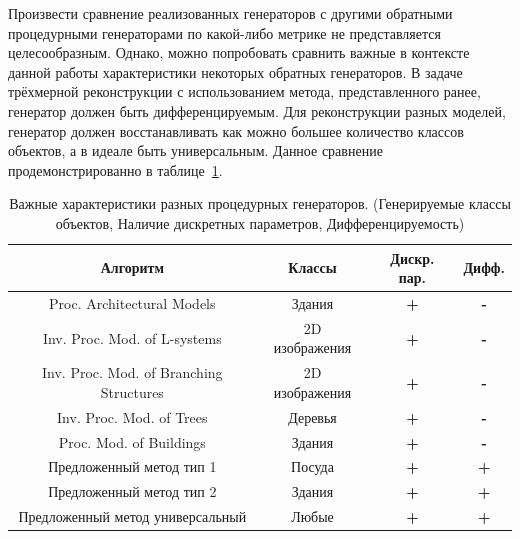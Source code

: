 \documentclass[a4paper,hidelinks,12pt]{article}
\begin{document}
Произвести сравнение реализованных генераторов с другими обратными процедурными генераторами по какой-либо метрике не представляется целесообразным. Однако, можно попробовать сравнить важные в контексте данной работы характеристики некоторых обратных генераторов. В задаче трёхмерной реконструкции с использованием метода, представленного ранее, генератор должен быть дифференцируемым. Для реконструкции разных моделей, генератор должен восстанавливать как можно большее количество классов объектов, а в идеале быть универсальным. Данное сравнение продемонстрированно в таблице~\ref{comp_table}.

\begin{table}[H] 
	\begin{tabularx}{\textwidth}{cccc}
		\toprule
		\textbf{Алгоритм}	& \textbf{Классы}	& \textbf{Дискр. пар.} & \textbf{Дифф.}\\
		\midrule
		Proc. Architectural Models \cite{urban1} 		& Здания & \textbf{+} & \textbf{-}\\
		Inv. Proc. Mod. of L-systems \cite{vst2010inverse} 	& 2D изображения & \textbf{+} & \textbf{-}\\
		Inv. Proc. Mod. of Branching Structures \cite{guo2020inverse} 	& 2D изображения & \textbf{+} & \textbf{-}\\
		Inv. Proc. Mod. of Trees \cite{stava2014inverse}     & Деревья & \textbf{+} & \textbf{-}\\
		Proc. Mod. of Buildings \cite{muller2006procedural}      & Здания & \textbf{+} & \textbf{-}\\
		Предложенный метод тип 1	& Посуда & \textbf{+} & \textbf{+}\\
		Предложенный метод тип 2	& Здания & \textbf{+} & \textbf{+}\\
		Предложенный метод универсальный	& Любые & \textbf{+} & \textbf{+}\\
		\bottomrule
	\end{tabularx}
 \caption{Важные характеристики разных процедурных генераторов. (Генерируемые классы объектов, Наличие дискретных параметров, Дифференцируемость)}\label{comp_table}
\end{table}
\end{document}
